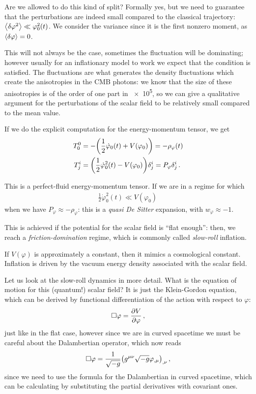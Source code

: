 \documentclass[main.tex]{subfiles}
\begin{document}
Are we allowed to do this kind of split?
Formally yes, but we need to guarantee that the perturbations are indeed small compared to the classical trajectory: \(\expval{ \delta \varphi^2} \ll \varphi_0^2 (t)\).
We consider the variance since it is the first nonzero moment, as \(\expval{ \delta \varphi }= 0\). 

This will not always be the case, sometimes the fluctuation will be dominating; however usually for an inflationary model to work we expect that the condition is satisfied.
The fluctuations are what generates the density fluctuations which create the anisotropies in the CMB photons: we know that the size of these anisotropies is of the order of one part in \num{e5}, so we can give a qualitative argument for the perturbations of the scalar field to be relatively small compared to the mean value. 

If we do the explicit computation for the energy-momentum tensor, we get 
%
\begin{align} \label{eq:energy-momentum-scalar-field}
T^{0}_{0} &= - \qty( \frac{1}{2} \dot{\varphi}_0(t) + V(\varphi_0 )) = - \rho_\varphi (t)   \\
T^{i}_{j} &= \qty( \frac{1}{2} \dot{\varphi}_0^2 (t) - V(\varphi_0 )) \delta^{i}_{j} = P_\varphi \delta^{i}_{j}
\,.
\end{align}

This is a perfect-fluid energy-momentum tensor. 
If we are in a regime for which 
%
\begin{align}
\frac{1}{2} \dot{\varphi}_0^2 (t) \ll V(\varphi_0 )
\,
\end{align}
%
when we have \(P_\varphi \approx - \rho _\varphi \): this is a \emph{quasi De Sitter} expansion, with \(w_\varphi \approx -1\). 

This is achieved if the potential for the scalar field is ``flat enough'': then, we reach a \emph{friction-domination} regime, which is commonly called \emph{slow-roll} inflation. 


If \(V(\varphi )\) is approximately a constant, then it mimics a cosmological constant. 
Inflation is driven by the vacuum energy density associated with the scalar field. 

Let us look at the slow-roll dynamics in more detail. 
What is the equation of motion for this (quantum!) scalar field? It is just the Klein-Gordon equation, which can be derived by functional differentiation of the action with respect to \(\varphi \): 
%
\begin{align}
\square \varphi = \pdv{V}{\varphi }
\,,
\end{align}
%
just like in the flat case, however since we are in curved spacetime we must be careful about the Dalambertian operator, which now reads 
%
\begin{align}
\square \varphi = \frac{1}{\sqrt{-g}} \qty(g^{\mu \nu } \sqrt{-g} \varphi_{, \mu })_{, \nu }
\,,
\end{align}
%
since we need to use the formula for the Dalambertian in curved spacetime, which can be calculating by substituting the partial derivatives with covariant ones. 
\end{document}
